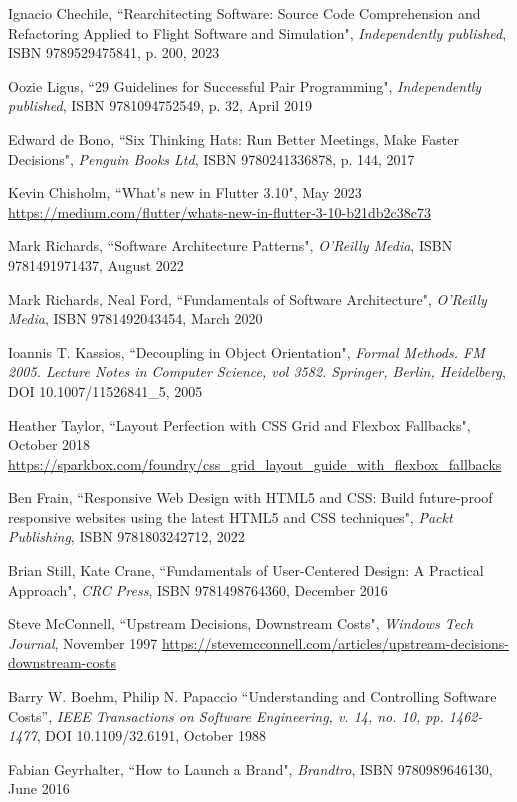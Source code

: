 \begin{thebibliography}{100}
 Ignacio Chechile, ``Rearchitecting Software: Source Code Comprehension and Refactoring 
Applied to Flight Software and Simulation", \emph{Independently published}, ISBN 9789529475841, p. 200, 2023

 Oozie Ligus, ``29 Guidelines for Successful Pair Programming", \emph{Independently published},
ISBN 9781094752549, p. 32,  April 2019

 Edward de Bono, ``Six Thinking Hats: Run Better Meetings, Make Faster Decisions",
\emph{Penguin Books Ltd}, ISBN 9780241336878, p. 144, 2017

 Kevin Chisholm, ``What's new in Flutter 3.10", May 2023
\href{https://medium.com/flutter/whats-new-in-flutter-3-10-b21db2c38c73}{https://medium.com/flutter/whats-new-in-flutter-3-10-b21db2c38c73}

 Mark Richards, ``Software Architecture Patterns", 
\emph{O'Reilly Media}, ISBN 9781491971437, August 2022

 Mark Richards, Neal Ford, ``Fundamentals of Software Architecture",
\emph{O'Reilly Media}, ISBN 9781492043454, March 2020  

 Ioannis T. Kassios, ``Decoupling in Object Orientation", \emph{Formal Methods. FM 2005. 
Lecture Notes in Computer Science, vol 3582. Springer, Berlin, Heidelberg}, DOI 10.1007/11526841\_5, 2005

 Heather Taylor, ``Layout Perfection with CSS Grid and Flexbox Fallbacks", October 2018
\href{https://sparkbox.com/foundry/css_grid_layout_guide_with_flexbox_fallbacks}{https://sparkbox.com/foundry/css\_grid\_layout\_guide\_with\_flexbox\_fallbacks}

 Ben Frain, ``Responsive Web Design with HTML5 and CSS: Build future-proof responsive 
websites using the latest HTML5 and CSS techniques", \emph{Packt Publishing}, ISBN 9781803242712, 2022

 Brian Still, Kate Crane, ``Fundamentals of User-Centered Design: A Practical Approach", 
\emph{CRC Press}, ISBN 9781498764360, December 2016

 Steve McConnell, ``Upstream Decisions, Downstream Costs", \emph{Windows Tech Journal}, November 1997
\href{https://stevemcconnell.com/articles/upstream-decisions-downstream-costs}{https://stevemcconnell.com/articles/upstream-decisions-downstream-costs}

 Barry W. Boehm, Philip N. Papaccio ``Understanding and Controlling Software Costs”,
\emph{IEEE Transactions on Software Engineering, v. 14, no. 10, pp. 1462-1477}, DOI 10.1109/32.6191, October 1988

 Fabian Geyrhalter, ``How to Launch a Brand", \emph{Brandtro}, ISBN 9780989646130, June 2016


\end{thebibliography}
